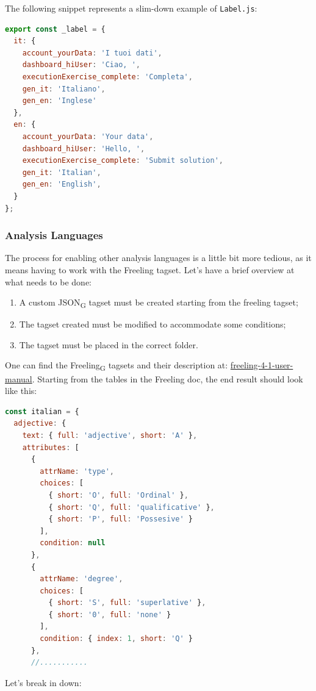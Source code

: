 The following snippet represents a slim-down example of \texttt{Label.js}:
\begin{lstlisting}[language=JavaScript, frame=single]
export const _label = {
  it: {
    account_yourData: 'I tuoi dati',
    dashboard_hiUser: 'Ciao, ',
    executionExercise_complete: 'Completa',
    gen_it: 'Italiano',
    gen_en: 'Inglese'
  },
  en: {
    account_yourData: 'Your data',
    dashboard_hiUser: 'Hello, ',
    executionExercise_complete: 'Submit solution',
    gen_it: 'Italian',
    gen_en: 'English',
  }
};
\end{lstlisting}


\subsubsection{Analysis Languages}
The process for enabling other analysis languages is a little bit more tedious, as it means having to work with the Freeling tagset.
Let's have a brief overview at what needs to be done:
\begin{enumerate}
\item A custom {JSON}\textsubscript{G} tagset must be created starting from the freeling tagset;
\item The tagset created must be modified to accommodate some conditions;
\item The tagset must be placed in the correct folder.
\end{enumerate}
One can find the {Freeling}\textsubscript{G} tagsets and their description at: \href{https://talp-upc.gitbook.io/freeling-4-1-user-manual/tagsets}{freeling-4-1-user-manual}. Starting from the tables in the Freeling doc, the end result should look like this:
\begin{lstlisting}[language=JavaScript, frame=single]
const italian = {
  adjective: {
    text: { full: 'adjective', short: 'A' },
    attributes: [
      {
        attrName: 'type',
        choices: [
          { short: 'O', full: 'Ordinal' },
          { short: 'Q', full: 'qualificative' },
          { short: 'P', full: 'Possesive' }
        ],
        condition: null
      },
      {
        attrName: 'degree',
        choices: [
          { short: 'S', full: 'superlative' },
          { short: '0', full: 'none' }
        ],
        condition: { index: 1, short: 'Q' }
      },
      //...........
\end{lstlisting}
Let's break in down:
